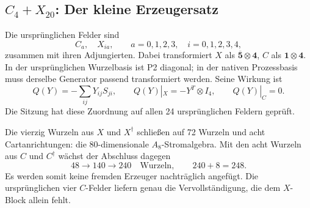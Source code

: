 \subsection{$C_4+X_{20}$: Der kleine Erzeugersatz}
Die ursprünglichen Felder sind
\begin{equation}
C_a,\quad X_{ia},\qquad a=0,1,2,3,\quad i=0,1,2,3,4,
\end{equation}
zusammen mit ihren Adjungierten. Dabei transformiert $X$ als $\overline{\mathbf5}\otimes\mathbf4$, $C$ als $\mathbf1\otimes\mathbf4$. In der ursprünglichen Wurzelbasis ist P2 diagonal; in der nativen Prozessbasis muss derselbe Generator passend transformiert werden. Seine Wirkung ist
\begin{equation}
Q(Y)=-\sum_{ij}Y_{ij}S_{ji},\qquad Q(Y)|_X=-Y^T\otimes I_4,
\qquad Q(Y)|_C=0.
\end{equation}
Die Sitzung hat diese Zuordnung auf allen 24 ursprünglichen Feldern geprüft.

Die vierzig Wurzeln aus $X$ und $X^\dagger$ schließen auf 72 Wurzeln und acht Cartanrichtungen: die $80$-dimensionale $A_8$-Stromalgebra. Mit den acht Wurzeln aus $C$ und $C^\dagger$ wächst der Abschluss dagegen
\begin{equation}
48\longrightarrow140\longrightarrow240\quad\text{Wurzeln},
\qquad240+8=248.
\end{equation}
Es werden somit keine fremden Erzeuger nachträglich angefügt. Die ursprünglichen vier $C$-Felder liefern genau die Vervollständigung, die dem $X$-Block allein fehlt.

\begin{center}
\end{center}


